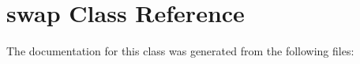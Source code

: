 \section{swap Class Reference}
\label{classstd_1_1swap}


The documentation for this class was generated from the following files: